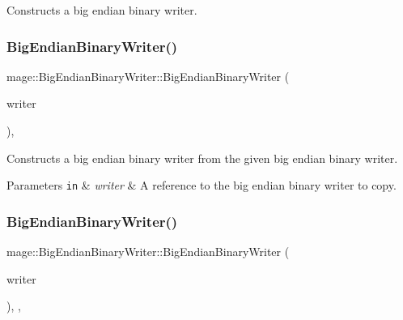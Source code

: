 Constructs a big endian binary writer. \hypertarget{classmage_1_1_big_endian_binary_writer_aafe65752342b2740e7293878ae469d9f}{}\label{classmage_1_1_big_endian_binary_writer_aafe65752342b2740e7293878ae469d9f} 
\subsubsection{\texorpdfstring{Big\+Endian\+Binary\+Writer()}{BigEndianBinaryWriter()}\hspace{0.1cm}{\footnotesize\ttfamily [2/3]}}
{\footnotesize\ttfamily mage\+::\+Big\+Endian\+Binary\+Writer\+::\+Big\+Endian\+Binary\+Writer (\begin{DoxyParamCaption}\item[{const \hyperlink{classmage_1_1_big_endian_binary_writer}{Big\+Endian\+Binary\+Writer} \&}]{writer }\end{DoxyParamCaption})\hspace{0.3cm}{\ttfamily [protected]}, {\ttfamily [delete]}}

Constructs a big endian binary writer from the given big endian binary writer.


\begin{DoxyParams}[1]{Parameters}
\mbox{\tt in}  & {\em writer} & A reference to the big endian binary writer to copy. \\
\hline
\end{DoxyParams}
\hypertarget{classmage_1_1_big_endian_binary_writer_aaf2dcf536afefc7b0ca8b0752024311d}{}\label{classmage_1_1_big_endian_binary_writer_aaf2dcf536afefc7b0ca8b0752024311d} 
\subsubsection{\texorpdfstring{Big\+Endian\+Binary\+Writer()}{BigEndianBinaryWriter()}\hspace{0.1cm}{\footnotesize\ttfamily [3/3]}}
{\footnotesize\ttfamily mage\+::\+Big\+Endian\+Binary\+Writer\+::\+Big\+Endian\+Binary\+Writer (\begin{DoxyParamCaption}\item[{\hyperlink{classmage_1_1_big_endian_binary_writer}{Big\+Endian\+Binary\+Writer} \&\&}]{writer }\end{DoxyParamCaption})\hspace{0.3cm}{\ttfamily [protected]}, {\ttfamily [default]}, {\ttfamily [noexcept]}}

